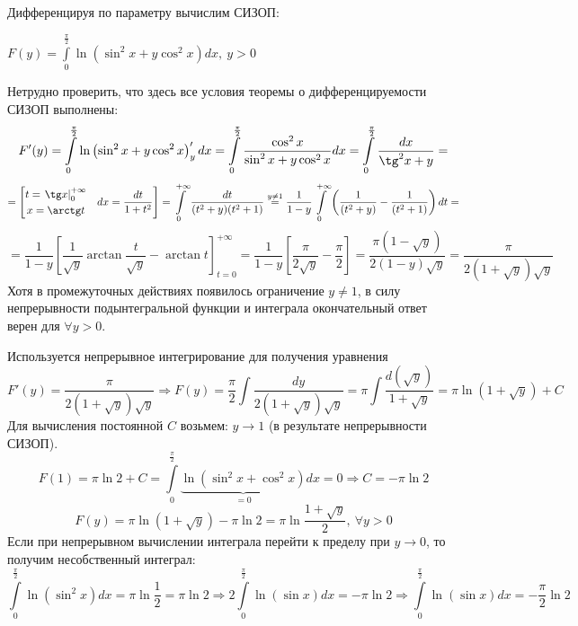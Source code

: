\documentclass[../../main.tex]{subfiles}
\begin{document}
\begin{example}
    Дифференцируя по параметру вычислим СИЗОП:

    $F(y) = \int\limits_0^{\frac{\pi}{2}} \ln
    \left( \sin^2 x + y \cos^2 x \right) dx, \ y > 0$

    Нетрудно проверить, что здесь все условия теоремы о дифференцируемости СИЗОП
    выполнены:
    \[ F'(y) = \int\limits_0^{\frac{\pi}{2}} \ln
    \left( \sin^2 x + y \cos^2 x \right)'_y dx = 
    \int\limits_0^{\frac{\pi}{2}} \dfrac{\cos^2 x}{\sin^2 x + y \cos^2 x} dx =
    \int\limits_0^{\frac{\pi}{2}} \dfrac{dx}{\tg^2 x  + y} = \]
    \[ = \left[
    \begin{gathered}
        t = \left. \tg x \right|_0^{+\infty} \\
        x = \arctan t
    \end{gathered} \ \ \
    dx = \dfrac{dt}{1 + t^2}
    \right] = \int\limits_0^{+\infty} \dfrac{dt}{(t^2 + y)(t^2 + 1)}
    \overset{y \neq 1}{=}
    \dfrac{1}{1-y} \int\limits_0^{+\infty} \left( \dfrac{1}{(t^2 + y)} -
    \dfrac{1}{(t^2 + 1)} \right) dt = \]
    \[ = \dfrac{1}{1 - y} \left[ \dfrac{1}{\sqrt{y}} \arctan \dfrac{t}{\sqrt{y}}
    - \arctan t \right]_{t = 0}^{+\infty} = \dfrac{1}{1 - y} \left[ \dfrac{\pi}{2 \sqrt{y}}
    - \dfrac{\pi}{2} \right] = \dfrac{\pi (1 - \sqrt{y})}{2 (1 - y) \sqrt{y}} =
    \dfrac{\pi}{2 (1 + \sqrt{y}) \sqrt{y}} \]
    Хотя в промежуточных действиях появилось ограничение $y \neq 1$, в силу непрерывности
    подынтегральной функции и интеграла окончательный ответ верен для
    $\forall y > 0$.

    Используется непрерывное интегрирование для получения уравнения
    \[F'(y) = \dfrac{\pi}{2(1+\sqrt{y})\sqrt{y}} \Longrightarrow F(y) =
    \dfrac{\pi}{2} \int \dfrac{dy}{2 (1 + \sqrt{y}) \sqrt{y}}  = \pi
    \int \dfrac{d(\sqrt{y})}{1 + \sqrt{y}} = \pi \ln (1 + \sqrt{y}) + C \]
    Для вычисления постоянной $C$ возьмем: $y \to 1$ (в результате
    непрерывности СИЗОП).
    \[F(1) = \pi \ln 2 + C = \int\limits_0^{\frac{\pi}{2}}
    \underbrace{ \ln \left( \sin^2 x + \cos^2 x \right)}_{= 0} dx = 0
    \Longrightarrow C = -\pi \ln 2\]
    \[F(y) = \pi \ln(1 + \sqrt{y}) - \pi \ln 2 = \pi \ln \dfrac{1 + \sqrt{y}}{2}, \
    \forall y > 0\]
    Если при непрерывном вычислении интеграла перейти к пределу при $y \to 0$,
    то получим несобственный интеграл:
    \[ \int\limits_0^{\frac{\pi}{2}} \ln (\sin^2 x)dx = \pi \ln \dfrac{1}{2} =
    \pi \ln 2 \Longrightarrow 2 \int\limits_0^{\frac{\pi}{2}} \ln (\sin x) dx = 
    - \pi \ln 2 \Longrightarrow \int\limits_0^{\frac{\pi}{2}} \ln (\sin x) dx = 
    - \dfrac{\pi}{2}\ln 2\]
    
\end{example}
\end{document}
